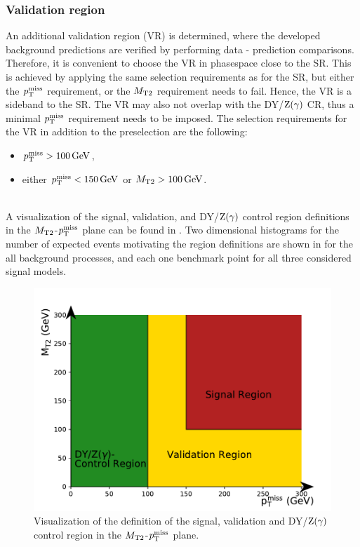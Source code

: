 \subsubsection{Validation region}
An additional validation region (VR) is determined, where the developed background predictions are verified by performing data - prediction comparisons. Therefore, it is convenient to choose the VR in phasespace close to the SR. This is achieved by applying the same selection requirements as for the SR, but either the $p_{\mathrm{T}}^\text{miss}$ requirement, or the $M_{\mathrm{T2}}$ requirement needs to fail. Hence, the VR is a sideband to the SR. The VR may also not overlap with the DY/$\mathrm{Z}(\gamma)$ CR, thus a minimal $p_{\mathrm{T}}^\text{miss}$ requirement needs to be imposed. The selection requirements for the VR in addition to the preselection are the following:
\begin{itemize}
 \item $p_{\mathrm{T}}^\text{miss}>100\,\text{Ge\hspace{-.08em}V}$,
 \item either $p_{\mathrm{T}}^\text{miss}<150\,\text{Ge\hspace{-.08em}V}$ or $M_{\mathrm{T2}}>100\,\text{Ge\hspace{-.08em}V}$.
\end{itemize}
\\
A visualization of the signal, validation, and DY/$\mathrm{Z}(\gamma)$ control region definitions in the $M_{\mathrm{T2}}$-$p_{\mathrm{T}}^\text{miss}$ plane can be found in . Two dimensional histograms for the number of expected events motivating the region definitions are shown in  for the all background processes, and each one benchmark point for all three considered signal models.
\begin{figure}[tbp]
 \centering
 \includegraphics[width=\pairwidth]{figures/figures/regions}
 \caption{Visualization of the definition of the signal, validation and DY/$\mathrm{Z}(\gamma)$ control region in the $M_{\mathrm{T2}}$-$p_{\mathrm{T}}^\text{miss}$ plane.}
 \label{fig:Regions}
\end{figure}
